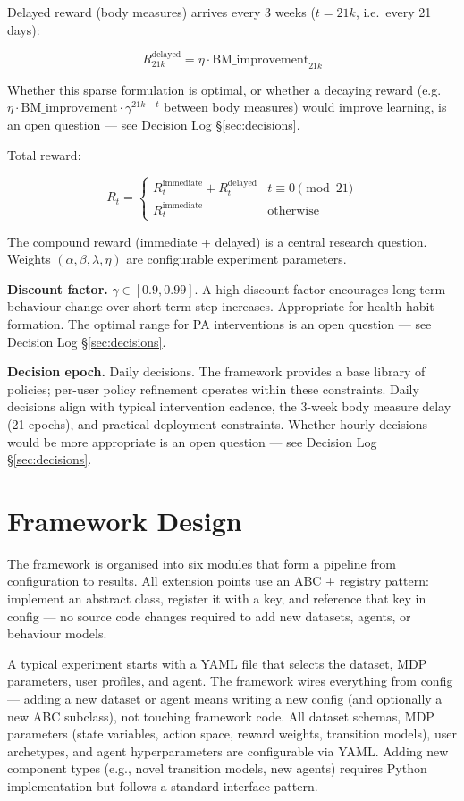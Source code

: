 \documentclass[11pt,a4paper]{article}
\begin{document}
Delayed reward (body measures) arrives every 3 weeks ($t = 21k$, i.e.\ every 21 days):

\[
R_{21k}^{\text{delayed}} = \eta \cdot \text{BM\_improvement}_{21k}
\]

Whether this sparse formulation is optimal, or whether a decaying reward
(e.g.\ $\eta \cdot \text{BM\_improvement} \cdot \gamma^{21k-t}$ between
body measures) would improve learning, is an open question
--- see Decision Log \S\ref{sec:decisions}.

Total reward:

\[
R_t =
\begin{cases}
R_t^{\text{immediate}} + R_t^{\text{delayed}} & t \equiv 0 \pmod{21} \\
R_t^{\text{immediate}} & \text{otherwise}
\end{cases}
\]

The compound reward (immediate + delayed) is a central research question.
Weights $(\alpha, \beta, \lambda, \eta)$ are configurable experiment parameters.

\textbf{Discount factor.} $\gamma \in [0.9, 0.99]$. A high discount factor
encourages long-term behaviour change over short-term step increases.
Appropriate for health habit formation. The optimal range for PA interventions
is an open question --- see Decision Log \S\ref{sec:decisions}.

\textbf{Decision epoch.} Daily decisions. The framework provides a base library
of policies; per-user policy refinement operates within these constraints.
Daily decisions align with typical intervention cadence, the 3-week body
measure delay (21 epochs), and practical deployment constraints. Whether
hourly decisions would be more appropriate is an open question
--- see Decision Log \S\ref{sec:decisions}.

\section{Framework Design}
\label{sec:design}

The framework is organised into six modules that form a pipeline from
configuration to results. All extension points use an ABC + registry pattern:
implement an abstract class, register it with a key, and reference that key in
config --- no source code changes required to add new datasets, agents, or
behaviour models.

A typical experiment starts with a YAML file that selects the dataset,
MDP parameters, user profiles, and agent. The framework wires everything
from config --- adding a new dataset or agent means writing a new config
(and optionally a new ABC subclass), not touching framework code. All dataset schemas, MDP parameters (state variables, action space, reward weights, transition models), user archetypes, and agent hyperparameters are configurable via YAML. Adding new component types (e.g., novel transition models, new agents) requires Python implementation but follows a standard interface pattern.
\end{document}
